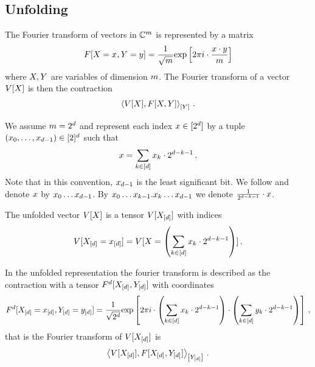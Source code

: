 \subsection{Unfolding}

The Fourier transform of vectors in $\mathbb{C}^{m}$ is represented by a matrix
\begin{align*}
    F[X_{}=x_{},Y=y]
    = \frac{1}{\sqrt{m}} \mathrm{exp}\left[2\pi i \cdot \frac{x\cdot y}{m}\right]
\end{align*}
where $X,Y$ are variables of dimension $m$.
The Fourier transform of a vector $V[X]$ is then the contraction
\begin{align*}
    \left\langle V[X],F[X,Y]\right\rangle_{\left[ Y \right]} \, .
\end{align*}

We assume $m=2^{d}$ and represent each index $x\in[2^{d}]$ by a tuple $(x_{0},\ldots,x_{d-1})\in[2]^{d}$ such that
\begin{align*}
    x
    = \sum_{k\in[d]} x_{k} \cdot 2^{d-k-1} \, .
\end{align*}
Note that in this convention, $x_{d-1}$ is the least significant bit.
We follow \cite{nielsen_quantum_2010} and denote $x$ by $x_{0}\ldots x_{d-1}$.
By $x_{0}\ldots x_{k-1}.x_{k}\ldots x_{d-1}$ we denote $\frac{1}{2^{d-k-1}} \cdot x$.

The unfolded vector $V[X]$ is a tensor $V[X_{[d]}]$ with indices
\begin{align*}
    V[X_{[d]}=x_{[d]}]
    = V[X=\left(\sum_{k\in[d]} x_{k} \cdot 2^{d-k-1}\right)] \, .
\end{align*}

In the unfolded representation the fourier transform is described as the contraction with a tensor $F^{d}[X_{[d]},Y_{[d]}]$ with coordinates
\begin{align*}
    F^{d}[X_{[d]}=x_{[d]},Y_{[d]}=y_{[d]}]
    = \frac{1}{\sqrt{2^d}} \mathrm{exp}\left[2\pi i
    \cdot \left(\sum_{k\in[d]} x_{k} \cdot 2^{d-k-1}\right)
    \cdot \left(\sum_{k\in[d]} y_{k} \cdot 2^{d-k-1}\right)
    \right] \, ,
\end{align*}
that is the Fourier transform of $V[X_{[d]}]$ is
\begin{align*}
    \left\langle V[X_{[d]}],F[X_{[d]},Y_{[d]}]\right\rangle_{\left[ Y_{[d]} \right]} \, .
\end{align*}